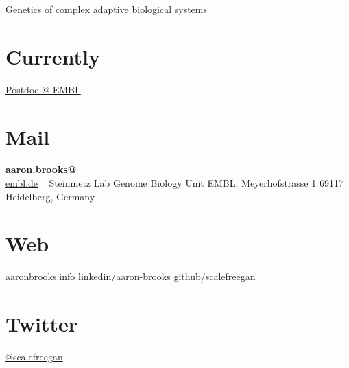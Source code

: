 \documentclass[]{friggeri-cv}
\begin{document}
      {\hspace{.2\textwidth} Genetics of complex adaptive biological systems}


\begin{aside}
  \section{Currently}
    \href{http://www.embl.de/research/units/genome_biology/steinmetz/}{Postdoc @ EMBL}
    ~
  \section{Mail}
    \href{mailto:aaron.brooks@embl.de}{\textbf{aaron.brooks@}\\embl.de}
    ~
    Steinmetz Lab
    Genome Biology Unit
    EMBL, Meyerhofstrasse 1
    69117 Heidelberg, Germany
    ~
  \section{Web}
    \href{http://www.aaron-brooks.org}{aaronbrooks.info}
    \href{https://www.linkedin.com/pub/aaron-brooks/17/774/3b3}{linkedin/aaron-brooks}
    \href{https://github.com/scalefreegan}{github/scalefreegan}
   ~
  \section{Twitter}
    \href{https://twitter.com/scalefreegan}{@scalefreegan}
    ~
    ~
    ~
    ~
    ~
    ~
    ~
    ~
    ~
    ~
    ~
    ~
    ~
    ~
    ~
    ~
    ~
\end{aside}
\end{document}
